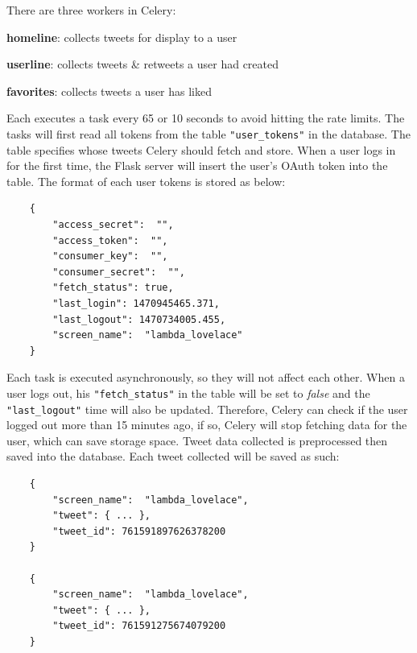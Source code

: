 \documentclass{article}
\begin{document}
\begin{samepage}
\noindent There are three workers in Celery:

\begin{itemize*}
    \item \textbf{homeline}: collects tweets for display to a user
    \item \textbf{userline}: collects tweets \& retweets a user had created
    \item \textbf{favorites}: collects tweets a user has liked
\end{itemize*}
\end{samepage}

\noindent Each executes a task every 65 or 10 seconds to avoid hitting the rate limits. The tasks will first read all tokens from the table \texttt{"user\_tokens"} in the database. The table specifies whose tweets Celery should fetch and store. When a user logs in for the first time, the Flask server will insert the user’s OAuth token into the table. The format of each user tokens is stored as below:

\begin{samepage}
\begin{verbatim}
    {
        "access_secret":  "", 
        "access_token":  "", 
        "consumer_key":  "", 
        "consumer_secret":  "",
        "fetch_status": true,
        "last_login": 1470945465.371,
        "last_logout": 1470734005.455,
        "screen_name":  "lambda_lovelace"
    }
\end{verbatim}
\end{samepage}

\noindent Each task is executed asynchronously, so they will not affect each other. When a user logs out, his \texttt{"fetch\_status"} in the table will be set to \textit{false} and the \texttt{"last\_logout"} time will also be updated. Therefore, Celery can check if the user logged out more than 15 minutes ago, if so, Celery will stop fetching data for the user, which can save storage space. Tweet data collected is preprocessed then saved into the database. Each tweet collected will be saved as such:

\begin{samepage}
\begin{verbatim}
    {
        "screen_name":  "lambda_lovelace",
        "tweet": { ... },
        "tweet_id": 761591897626378200
    } 
    
    {
        "screen_name":  "lambda_lovelace",
        "tweet": { ... },
        "tweet_id": 761591275674079200
    }
\end{verbatim}
\end{samepage}
\end{document}
